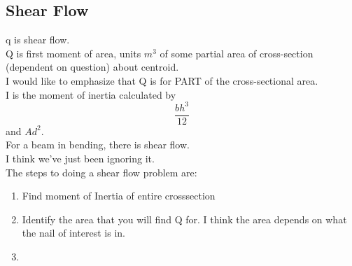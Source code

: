 \documentclass{article}
\numberwithin{equation}{subsection}
\begin{document}
\subsection{Shear Flow}

q is shear flow. \\
Q is first moment of area, units $m^3$ of some partial area of cross-section (dependent on question) about centroid. \\
I would like to emphasize that Q is for PART of the cross-sectional area. \\
I is the moment of inertia calculated by $$\frac{bh^3}{12}$$ and $Ad^2$. \\

For a beam in bending, there is shear flow. \\

I think we've just been ignoring it. \\

The steps to doing a shear flow problem are:
\begin{enumerate}
  \item Find moment of Inertia of entire crosssection
  \item Identify the area that you will find Q for. I think the area depends on what the nail of interest is in.
  \item 
\end{enumerate}
\end{document}
